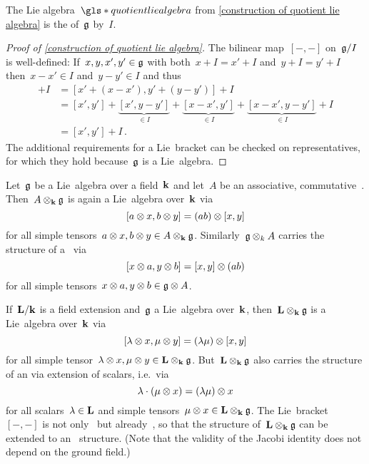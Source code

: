 \begin{definition}
  The Lie algebra~$\gls*{quotient lie algebra}$ from \cref{construction of quotient lie algebra} is the  of~$\mathfrak{g}$ by~$I$.
\end{definition}



\begin{proof}[Proof of \cref*{construction of quotient lie algebra}]
  The bilinear map~$[-,-]$ on~$\mathfrak{g}/I$ is well-defined:
  If~$x, y, x', y' \in \mathfrak{g}$ with both~$x+I = x'+I$ and~$y+I = y'+I$ then~$x-x' \in I$ and~$y-y' \in I$ and thus
  \begin{align*}
    [x,y] + I
    &=
    [x' + (x-x'), y' + (y-y')] + I \\
    &=
    [x',y']
    + \underbrace{[x', y-y']}_{\in I}
    + \underbrace{[x-x', y']}_{\in I}
    + \underbrace{[x-x', y-y']}_{\in I}
    + I
    \\
    &=
    [x', y'] + I  \,.
  \end{align*}
  The additional requirements for a Lie~bracket can be checked on representatives, for which they hold because~$\mathfrak{g}$ is a Lie~algebra.
\end{proof}


\begin{lemma}
  \label{quasi extension of scalars for lie algebras}
  Let~$\mathfrak{g}$ be a Lie~algebra over a field~$\kf$ and let~$A$ be an associative, commutative~{\algebra{$\kf$}}.
  Then~$A \otimes_{\mathbf{k}} \mathfrak{g}$ is again a Lie~algebra over~$\kf$ via
  \[
    [a \otimes x, b \otimes y]
    =
    (ab) \otimes [x,y]
  \]
  for all simple tensors~$a \otimes x, b \otimes y \in A \otimes_{\mathbf{k}} \mathfrak{g}$.
  Similarly~$\mathfrak{g} \otimes_k A$ carries the structure of a~{\liealgebra{$\kf$}} via
  \[
    [x \otimes a, y \otimes b]
    =
    [x,y] \otimes (ab)
  \]
  for all simple tensors~$x \otimes a, y \otimes b \in \mathfrak{g} \otimes A$.
\end{lemma}


\begin{example}
  If~$\mathbf{L}/\mathbf{k}$ is a field extension and~$\mathfrak{g}$ a Lie~algebra over~$\kf$, then~$\mathbf{L} \otimes_{\mathbf{k}} \mathfrak{g}$ is a Lie~algebra over~$\kf$ via
  \[
    [\lambda \otimes x, \mu \otimes y]
    = 
    (\lambda \mu) \otimes [x,y]
  \]
  for all simple tensor~$\lambda \otimes x, \mu \otimes y \in \mathbf{L} \otimes_{\mathbf{k}} \mathfrak{g}$.
  But~$\mathbf{L} \otimes_{\mathbf{k}} \mathfrak{g}$ also carries the structure of an {\vectorspace{$\Lf$}} via extension of scalars, i.e.\ via
  \[
    \lambda \cdot (\mu \otimes x)
    =
    (\lambda \mu) \otimes x
  \]
  for all scalars~$\lambda \in \mathbf{L}$ and simple tensors~$\mu \otimes x \in \mathbf{L} \otimes_{\mathbf{k}} \mathfrak{g}$.
  The Lie~bracket~$[-,-]$ is not only~{\bilinear{$\kf$}} but already~{\bilinear{$\Lf$}}, so that the {\liealgebra{$\kf$}} structure of~$\mathbf{L} \otimes_{\mathbf{k}} \mathfrak{g}$ can be extended to an~{\liealgebra{$\Lf$}} structure.
  (Note that the validity of the Jacobi identity does not depend on the ground field.)
\end{example}



